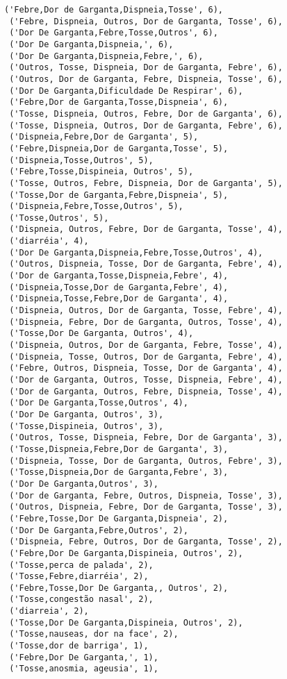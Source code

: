 \documentclass[11pt]{article}
\begin{document}
\begin{tcolorbox}[breakable, size=fbox, boxrule=.5pt, pad at break*=1mm, opacityfill=0]
\begin{Verbatim}[commandchars=\\\{\}]
 ('Febre,Dor de Garganta,Dispneia,Tosse', 6),
 ('Febre, Dispneia, Outros, Dor de Garganta, Tosse', 6),
 ('Dor De Garganta,Febre,Tosse,Outros', 6),
 ('Dor De Garganta,Dispneia,', 6),
 ('Dor De Garganta,Dispneia,Febre,', 6),
 ('Outros, Tosse, Dispneia, Dor de Garganta, Febre', 6),
 ('Outros, Dor de Garganta, Febre, Dispneia, Tosse', 6),
 ('Dor De Garganta,Dificuldade De Respirar', 6),
 ('Febre,Dor de Garganta,Tosse,Dispneia', 6),
 ('Tosse, Dispneia, Outros, Febre, Dor de Garganta', 6),
 ('Tosse, Dispneia, Outros, Dor de Garganta, Febre', 6),
 ('Dispneia,Febre,Dor de Garganta', 5),
 ('Febre,Dispneia,Dor de Garganta,Tosse', 5),
 ('Dispneia,Tosse,Outros', 5),
 ('Febre,Tosse,Dispineia, Outros', 5),
 ('Tosse, Outros, Febre, Dispneia, Dor de Garganta', 5),
 ('Tosse,Dor de Garganta,Febre,Dispneia', 5),
 ('Dispneia,Febre,Tosse,Outros', 5),
 ('Tosse,Outros', 5),
 ('Dispneia, Outros, Febre, Dor de Garganta, Tosse', 4),
 ('diarréia', 4),
 ('Dor De Garganta,Dispneia,Febre,Tosse,Outros', 4),
 ('Outros, Dispneia, Tosse, Dor de Garganta, Febre', 4),
 ('Dor de Garganta,Tosse,Dispneia,Febre', 4),
 ('Dispneia,Tosse,Dor de Garganta,Febre', 4),
 ('Dispneia,Tosse,Febre,Dor de Garganta', 4),
 ('Dispneia, Outros, Dor de Garganta, Tosse, Febre', 4),
 ('Dispneia, Febre, Dor de Garganta, Outros, Tosse', 4),
 ('Tosse,Dor De Garganta, Outros', 4),
 ('Dispneia, Outros, Dor de Garganta, Febre, Tosse', 4),
 ('Dispneia, Tosse, Outros, Dor de Garganta, Febre', 4),
 ('Febre, Outros, Dispneia, Tosse, Dor de Garganta', 4),
 ('Dor de Garganta, Outros, Tosse, Dispneia, Febre', 4),
 ('Dor de Garganta, Outros, Febre, Dispneia, Tosse', 4),
 ('Dor De Garganta,Tosse,Outros', 4),
 ('Dor De Garganta, Outros', 3),
 ('Tosse,Dispineia, Outros', 3),
 ('Outros, Tosse, Dispneia, Febre, Dor de Garganta', 3),
 ('Tosse,Dispneia,Febre,Dor de Garganta', 3),
 ('Dispneia, Tosse, Dor de Garganta, Outros, Febre', 3),
 ('Tosse,Dispneia,Dor de Garganta,Febre', 3),
 ('Dor De Garganta,Outros', 3),
 ('Dor de Garganta, Febre, Outros, Dispneia, Tosse', 3),
 ('Outros, Dispneia, Febre, Dor de Garganta, Tosse', 3),
 ('Febre,Tosse,Dor De Garganta,Dispneia', 2),
 ('Dor De Garganta,Febre,Outros', 2),
 ('Dispneia, Febre, Outros, Dor de Garganta, Tosse', 2),
 ('Febre,Dor De Garganta,Dispineia, Outros', 2),
 ('Tosse,perca de palada', 2),
 ('Tosse,Febre,diarréia', 2),
 ('Febre,Tosse,Dor De Garganta,, Outros', 2),
 ('Tosse,congestão nasal', 2),
 ('diarreia', 2),
 ('Tosse,Dor De Garganta,Dispineia, Outros', 2),
 ('Tosse,nauseas, dor na face', 2),
 ('Tosse,dor de barriga', 1),
 ('Febre,Dor De Garganta,', 1),
 ('Tosse,anosmia, ageusia', 1),

\end{Verbatim}
\end{tcolorbox}
\end{document}
